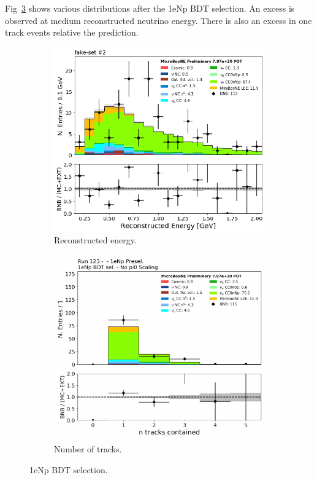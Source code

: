 Fig~\ref{fig:fakedata:set2:npsel} shows various distributions after the 1eNp BDT selection.  An excess is observed at medium reconstructed neutrino energy. There is also an excess in one track events relative the prediction.

\begin{figure}[H] 
\begin{center}
    \begin{subfigure}[b]{0.45\textwidth}
    \centering
    \includegraphics[width=1.00\textwidth]{Fakedata/set2/Np_postsel_recoe.pdf}
    \caption{\label{fig:fakedata:set2:Np_postsel_recoe} Reconstructed energy.}
    \end{subfigure}
    \begin{subfigure}[b]{0.45\textwidth}
    \centering
    \includegraphics[width=1.00\textwidth]{Fakedata/set2/Np_postsel_ntracks.pdf}
    \caption{\label{fig:fakedata:set2:Np_postsel_ntracks} Number of tracks.}
    \end{subfigure}
\caption{\label{fig:fakedata:set2:npsel} 1eNp BDT selection.}
\end{center}
\end{figure}

